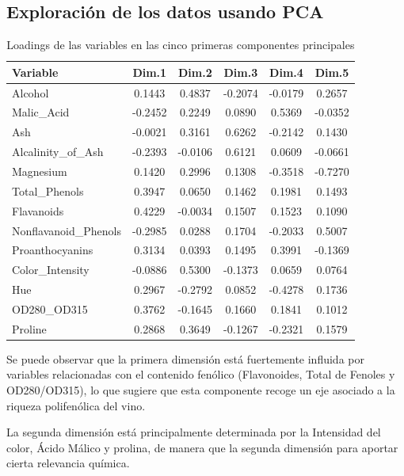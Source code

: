 \subsection{Exploración de los datos usando PCA}

\begin{table}[H]
\centering
\caption{Loadings de las variables en las cinco primeras componentes principales}
\begin{tabular}{lccccc}
\toprule
\textbf{Variable} & \textbf{Dim.1} & \textbf{Dim.2} & \textbf{Dim.3} & \textbf{Dim.4} & \textbf{Dim.5} \\
\midrule
Alcohol                & 0.1443 & 0.4837 & -0.2074 & -0.0179 & 0.2657 \\
Malic\_Acid            & -0.2452 & 0.2249 & 0.0890 & 0.5369 & -0.0352 \\
Ash                    & -0.0021 & 0.3161 & 0.6262 & -0.2142 & 0.1430 \\
Alcalinity\_of\_Ash    & -0.2393 & -0.0106 & 0.6121 & 0.0609 & -0.0661 \\
Magnesium              & 0.1420 & 0.2996 & 0.1308 & -0.3518 & -0.7270 \\
Total\_Phenols         & 0.3947 & 0.0650 & 0.1462 & 0.1981 & 0.1493 \\
Flavanoids             & 0.4229 & -0.0034 & 0.1507 & 0.1523 & 0.1090 \\
Nonflavanoid\_Phenols  & -0.2985 & 0.0288 & 0.1704 & -0.2033 & 0.5007 \\
Proanthocyanins        & 0.3134 & 0.0393 & 0.1495 & 0.3991 & -0.1369 \\
Color\_Intensity       & -0.0886 & 0.5300 & -0.1373 & 0.0659 & 0.0764 \\
Hue                    & 0.2967 & -0.2792 & 0.0852 & -0.4278 & 0.1736 \\
OD280\_OD315           & 0.3762 & -0.1645 & 0.1660 & 0.1841 & 0.1012 \\
Proline                & 0.2868 & 0.3649 & -0.1267 & -0.2321 & 0.1579 \\
\bottomrule
\end{tabular}
\label{tab:pca_loadings}
\end{table}

Se puede observar que la primera dimensión está fuertemente influida por variables relacionadas con el contenido fenólico (Flavonoides, Total de Fenoles y OD280/OD315), lo que sugiere que esta componente recoge un eje asociado a la riqueza polifenólica del vino.

La segunda dimensión está principalmente determinada por la Intensidad del color, Ácido Málico y prolina, de manera que la segunda dimensión para aportar cierta relevancia química.


